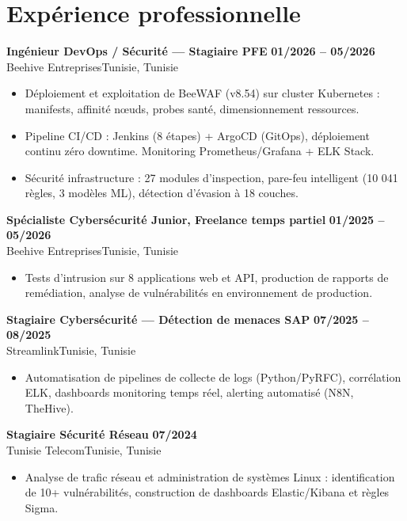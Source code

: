 \documentclass[a4paper,8pt]{article}
\newcommand{\cventry}[4]{\textbf{#1} \hfill \textbf{#4}\\[0.3pt]#2{\ifx\relax#3\relax\else, #3\fi}\par\vspace{0.3pt}}
\begin{document}
\section{Expérience professionnelle}
\cventry{Ingénieur DevOps / Sécurité --- Stagiaire PFE}{Beehive Entreprises}{Tunisie}{01/2026 -- 05/2026}
\begin{itemize}
  \item Déploiement et exploitation de BeeWAF (v8.54) sur cluster Kubernetes : manifests, affinité nœuds, probes santé, dimensionnement ressources.
  \item Pipeline CI/CD : Jenkins (8 étapes) + ArgoCD (GitOps), déploiement continu zéro downtime. Monitoring Prometheus/Grafana + ELK Stack.
  \item Sécurité infrastructure : 27 modules d'inspection, pare-feu intelligent (10 041 règles, 3 modèles ML), détection d'évasion à 18 couches.
\end{itemize}
\cventry{Spécialiste Cybersécurité Junior, Freelance temps partiel}{Beehive Entreprises}{Tunisie}{01/2025 -- 05/2026}
\begin{itemize}
  \item Tests d'intrusion sur 8 applications web et API, production de rapports de remédiation, analyse de vulnérabilités en environnement de production.
\end{itemize}
\cventry{Stagiaire Cybersécurité --- Détection de menaces SAP}{Streamlink}{Tunisie}{07/2025 -- 08/2025}
\begin{itemize}
  \item Automatisation de pipelines de collecte de logs (Python/PyRFC), corrélation ELK, dashboards monitoring temps réel, alerting automatisé (N8N, TheHive).
\end{itemize}
\cventry{Stagiaire Sécurité Réseau}{Tunisie Telecom}{Tunisie}{07/2024}
\begin{itemize}
  \item Analyse de trafic réseau et administration de systèmes Linux : identification de 10+ vulnérabilités, construction de dashboards Elastic/Kibana et règles Sigma.
\end{itemize}
\end{document}
